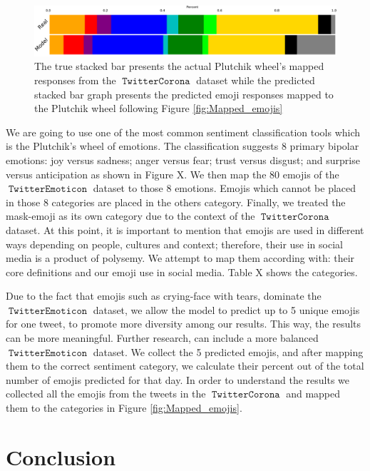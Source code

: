 \documentclass[11pt]{article}
\DeclareMathOperator{\emoticon}{\texttt{TwitterEmoticon}}
\DeclareMathOperator{\corona}{\texttt{TwitterCorona}}
\begin{document}
\begin{figure}
    \centering
    \includegraphics[width=\textwidth]{images/true_pred_fix.pdf}
    \caption{The true stacked bar presents the actual Plutchik wheel's mapped responses from the $\corona$ dataset while the predicted stacked bar graph presents the predicted emoji responses mapped to the Plutchik wheel following Figure  \ref{fig:Mapped_emojis} }
    \label{fig:actual vs pred}
\end{figure}

We are going to use one of the most common sentiment classification tools which is the Plutchik's wheel of emotions.
The classification \cite{} suggests 8 primary bipolar emotions: joy versus sadness; anger versus fear; trust versus disgust; 
and surprise versus anticipation as shown in Figure X. We then map the 80 emojis of the $\emoticon$ dataset
to those 8 emotions. Emojis which cannot be placed in those 8 categories are placed in the others category. 
Finally, we treated the mask-emoji as its own category due to the context of the $\corona$ dataset.
At this point, it is important to mention that emojis are used in different ways depending on people, cultures and context;
therefore, their use in social media is a product of polysemy. We attempt to map them according with: their core definitions and
our emoji use in social media. Table X shows the categories.  

Due to the fact that emojis such as crying-face with tears, dominate the $\emoticon$ dataset,
we allow the model to predict up to 5 unique emojis for one tweet, to promote more diversity among our results.
This way, the results can be more meaningful. Further research, can include a more balanced $\emoticon$ dataset.
We collect the 5 predicted emojis, and after mapping them to the correct sentiment category, we calculate their 
percent out of the total number of emojis predicted for that day. 
In order to understand the results we collected all the emojis from the tweets in the $\corona$ and mapped them to the categories in Figure \ref{fig:Mapped_emojis}.  

\section{Conclusion}
\end{document}

